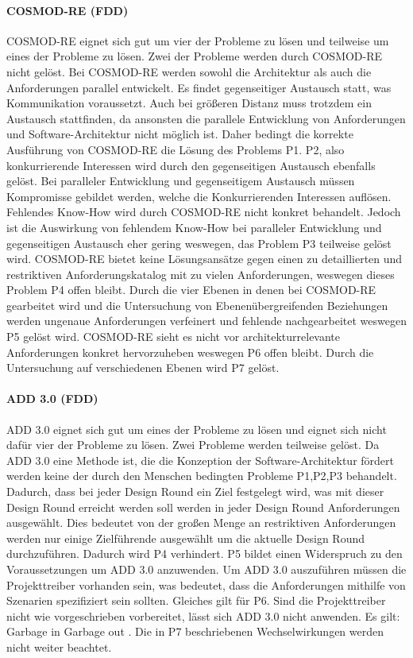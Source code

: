 \paragraph{COSMOD-RE (FDD)}
COSMOD-RE eignet sich gut um vier der Probleme zu lösen und teilweise um eines der Probleme zu lösen. Zwei der Probleme werden durch COSMOD-RE nicht gelöst. Bei COSMOD-RE werden sowohl die Architektur als auch die Anforderungen parallel entwickelt. Es findet gegenseitiger Austausch statt, was Kommunikation voraussetzt. Auch bei größeren Distanz muss trotzdem ein Austausch stattfinden, da ansonsten die parallele Entwicklung von Anforderungen und Software-Architektur nicht möglich ist. Daher bedingt die korrekte Ausführung von COSMOD-RE die Lösung des Problems P1. P2, also konkurrierende Interessen wird durch den gegenseitigen Austausch ebenfalls gelöst. Bei paralleler Entwicklung und gegenseitigem Austausch müssen Kompromisse gebildet werden, welche die Konkurrierenden Interessen auflösen. Fehlendes Know-How wird durch COSMOD-RE nicht konkret behandelt. Jedoch ist die Auswirkung von fehlendem Know-How bei paralleler Entwicklung und gegenseitigen Austausch eher gering weswegen, das Problem P3 teilweise gelöst wird. COSMOD-RE bietet keine Lösungsansätze gegen einen zu detaillierten und restriktiven Anforderungskatalog mit zu vielen Anforderungen, weswegen dieses Problem P4 offen bleibt. Durch die vier Ebenen in denen bei COSMOD-RE gearbeitet wird und die Untersuchung von Ebenenübergreifenden Beziehungen werden ungenaue Anforderungen verfeinert und fehlende nachgearbeitet weswegen P5 gelöst wird. COSMOD-RE sieht es nicht vor architekturrelevante Anforderungen konkret hervorzuheben weswegen P6 offen bleibt. Durch die Untersuchung auf verschiedenen Ebenen wird P7 gelöst.\\

\paragraph{ADD 3.0 (FDD)}
ADD 3.0 eignet sich gut um eines der Probleme zu lösen und eignet sich nicht dafür vier der Probleme zu lösen. Zwei Probleme werden teilweise gelöst. Da ADD 3.0 eine Methode ist, die die Konzeption der Software-Architektur fördert werden keine der durch den Menschen bedingten Probleme P1,P2,P3 behandelt. Dadurch, dass bei jeder Design Round ein Ziel festgelegt wird, was mit dieser Design Round erreicht werden soll werden in jeder Design Round Anforderungen ausgewählt. Dies bedeutet von der großen Menge an restriktiven Anforderungen werden nur einige Zielführende ausgewählt um die aktuelle Design Round durchzuführen. Dadurch wird P4 verhindert. P5 bildet einen Widerspruch zu den Voraussetzungen um ADD 3.0 anzuwenden. Um ADD 3.0 auszuführen müssen die Projekttreiber vorhanden sein, was bedeutet, dass die Anforderungen mithilfe von Szenarien spezifiziert sein sollten. Gleiches gilt für P6. Sind die Projekttreiber nicht wie vorgeschrieben vorbereitet, lässt sich ADD 3.0 nicht anwenden. Es gilt: Garbage in Garbage out \cite{Cer01}. Die in P7 beschriebenen Wechselwirkungen werden nicht weiter beachtet.\\
